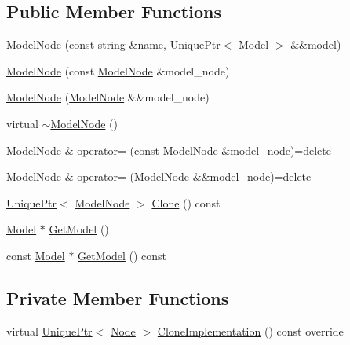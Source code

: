 \subsection*{Public Member Functions}
\begin{DoxyCompactItemize}
\item 
\hyperlink{classmage_1_1_model_node_a15d6a41cc5cdc90310313147100c1d6f}{Model\+Node} (const string \&name, \hyperlink{namespacemage_a8c307fbcc33bce9b7f2aa4c26c3b95cf}{Unique\+Ptr}$<$ \hyperlink{classmage_1_1_model}{Model} $>$ \&\&model)
\item 
\hyperlink{classmage_1_1_model_node_a409c098ddecf20d1b393d43c15d16482}{Model\+Node} (const \hyperlink{classmage_1_1_model_node}{Model\+Node} \&model\+\_\+node)
\item 
\hyperlink{classmage_1_1_model_node_a19ba577112ea488f227ea31642fb2cb2}{Model\+Node} (\hyperlink{classmage_1_1_model_node}{Model\+Node} \&\&model\+\_\+node)
\item 
virtual \hyperlink{classmage_1_1_model_node_a131c0062a1bed3d29fade27e602bec44}{$\sim$\+Model\+Node} ()
\item 
\hyperlink{classmage_1_1_model_node}{Model\+Node} \& \hyperlink{classmage_1_1_model_node_ad8378279b79930dfe98d176dbc1c5db9}{operator=} (const \hyperlink{classmage_1_1_model_node}{Model\+Node} \&model\+\_\+node)=delete
\item 
\hyperlink{classmage_1_1_model_node}{Model\+Node} \& \hyperlink{classmage_1_1_model_node_ad39321f4d392aa4e28169b8d7a08af68}{operator=} (\hyperlink{classmage_1_1_model_node}{Model\+Node} \&\&model\+\_\+node)=delete
\item 
\hyperlink{namespacemage_a8c307fbcc33bce9b7f2aa4c26c3b95cf}{Unique\+Ptr}$<$ \hyperlink{classmage_1_1_model_node}{Model\+Node} $>$ \hyperlink{classmage_1_1_model_node_a766f90e1d626c455ba552a3ded08b948}{Clone} () const
\item 
\hyperlink{classmage_1_1_model}{Model} $\ast$ \hyperlink{classmage_1_1_model_node_a358f3458d4444ea026467505eac0b675}{Get\+Model} ()
\item 
const \hyperlink{classmage_1_1_model}{Model} $\ast$ \hyperlink{classmage_1_1_model_node_a721b88e6649758b2258c95e972478249}{Get\+Model} () const
\end{DoxyCompactItemize}
\subsection*{Private Member Functions}
\begin{DoxyCompactItemize}
\item 
virtual \hyperlink{namespacemage_a8c307fbcc33bce9b7f2aa4c26c3b95cf}{Unique\+Ptr}$<$ \hyperlink{classmage_1_1_node}{Node} $>$ \hyperlink{classmage_1_1_model_node_a34146201083015276b38240af307417f}{Clone\+Implementation} () const override
\end{DoxyCompactItemize}
